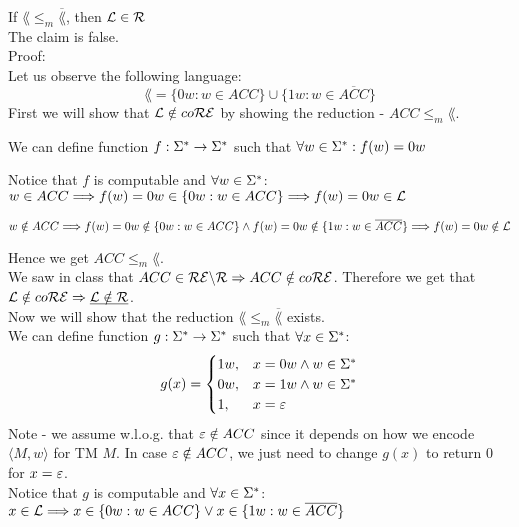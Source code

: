 If $\lang \leq_m \overline{\lang}$, then $\mathcal{L} \in \mathcal{R}$ \\

The claim is false. \\

Proof: \\
Let us observe the following language:
\[
    \lang = \{0w: w \in ACC\} \cup \{1w: w \in \overline{ACC}\}
\]
First we will show that $\mathcal{L} \notin co\mathcal{R}\mathcal{E}$ by showing the reduction - $ACC \leq_m \lang$.

We can define function $f: \Sigma^* \rightarrow \Sigma^*$ such that $\forall w \in \Sigma^*: f(w) = 0w$

Notice that $f$ is computable and $\forall w \in \Sigma^*$: \\
$w \in ACC \\
    \Longrightarrow f(w) = 0w \in \{0w: w \in ACC\} \\
    \Longrightarrow f(w) = 0w \in \mathcal{L}$

$w \notin ACC \\
    \Longrightarrow f(w) = 0w \notin \{0w: w \in ACC\} \wedge f(w) = 0w \notin \{1w: w \in \overline{ACC}\} \\
    \Longrightarrow f(w) = 0w \notin \mathcal{L}$

Hence we get $ACC \leq_m \lang$. \\
We saw in class that $ACC \in \mathcal{R}\mathcal{E} \backslash \mathcal{R} \Rightarrow ACC \notin co\mathcal{R}\mathcal{E}$.
Therefore we get that $\mathcal{L} \notin co\mathcal{R}\mathcal{E} \Rightarrow \underline{\mathcal{L} \notin \mathcal{R}}$. \\

Now we will show that the reduction $\lang \leq_m \overline{\lang}$ exists. \\
We can define function $g: \Sigma^* \rightarrow \Sigma^*$ such that $\forall x \in \Sigma^*$:
\[
    g(x) =
    \begin{cases}
        1w, & x = 0w \wedge w \in \Sigma^* \\
        0w, & x = 1w \wedge w \in \Sigma^* \\
        1,  & x = \varepsilon                 \\
    \end{cases}
\]
Note - we assume w.l.o.g. that $\varepsilon \notin ACC$ since it depends on
how we encode $\langle M, w \rangle$ for TM $M$.
In case $\varepsilon \notin ACC$, we just need to change $g(x)$ to return $0$ for $x = \varepsilon$. \\

Notice that $g$ is computable and $\forall x \in \Sigma^*$: \\
$x \in \mathcal{L} \\
    \Longrightarrow x \in \{0w: w \in ACC\} \vee x \in \{1w: w \in \overline{ACC}\}$

